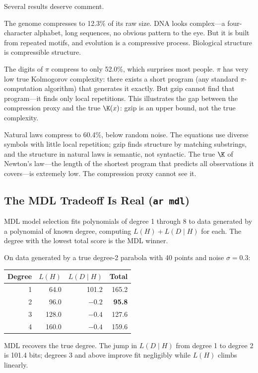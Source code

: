 Several results deserve comment.

The genome compresses to 12.3\% of its raw size. DNA looks complex---a
four-character alphabet, long sequences, no obvious pattern to the eye.
But it is built from repeated motifs, and evolution is a compressive
process. Biological structure is compressible structure.

The digits of $\pi$ compress to only 52.0\%, which surprises most
people. $\pi$ has very low true Kolmogorov complexity: there exists a
short program (any standard $\pi$-computation algorithm) that generates
it exactly. But gzip cannot find that program---it finds only local
repetitions. This illustrates the gap between the compression proxy and
the true $\K(x)$: gzip is an upper bound, not the true complexity.

Natural laws compress to 60.4\%, below random noise. The equations use
diverse symbols with little local repetition; gzip finds structure by
matching substrings, and the structure in natural laws is semantic, not
syntactic. The true $\K$ of Newton's law---the length of the shortest
program that predicts all observations it covers---is extremely low.
The compression proxy cannot see it.

\subsection{The MDL Tradeoff Is Real (\texttt{ar mdl})}

MDL model selection fits polynomials of degree 1 through 8 to data
generated by a polynomial of known degree, computing $L(H) + L(D \mid H)$
for each. The degree with the lowest total score is the MDL winner.

On data generated by a true degree-2 parabola with 40 points and noise
$\sigma = 0.3$:

\begin{center}
\begin{tabular}{rrrr}
\toprule
Degree & $L(H)$ & $L(D \mid H)$ & Total \\
\midrule
1 & 64.0 & 101.2 & 165.2 \\
2 & 96.0 & $-0.2$ & \textbf{95.8} \\
3 & 128.0 & $-0.4$ & 127.6 \\
4 & 160.0 & $-0.4$ & 159.6 \\
\bottomrule
\end{tabular}
\end{center}

MDL recovers the true degree. The jump in $L(D \mid H)$ from degree 1
to degree 2 is 101.4 bits; degrees 3 and above improve fit negligibly
while $L(H)$ climbs linearly.

